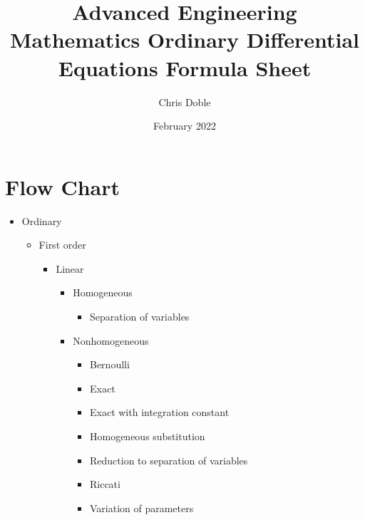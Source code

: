 \documentclass{article}
\title{Advanced Engineering Mathematics Ordinary Differential Equations Formula Sheet}
\author{Chris Doble}
\date{February 2022}
\begin{document}
\tableofcontents

\section{Flow Chart}

\begin{itemize}
  \item Ordinary

        \begin{itemize}
          \item First order

                \begin{itemize}
                  \item Linear

                        \begin{itemize}
                          \item Homogeneous

                                \begin{itemize}
                                  \item Separation of variables
                                \end{itemize}

                          \item Nonhomogeneous

                                \begin{itemize}
                                  \item Bernoulli

                                  \item Exact

                                  \item Exact with integration constant

                                  \item Homogeneous substitution

                                  \item Reduction to separation of variables

                                  \item Riccati

                                  \item Variation of parameters
                                \end{itemize}
                        \end{itemize}


\end{itemize}
\end{itemize}
\end{itemize}
\end{document}
